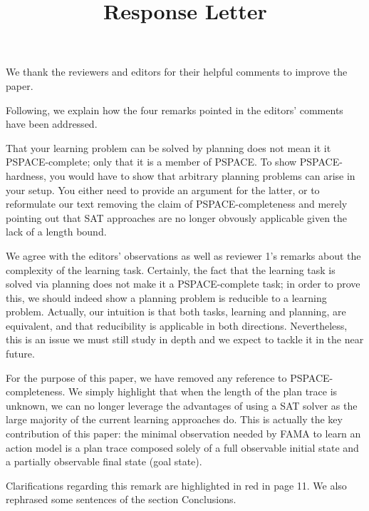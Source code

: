 \documentclass{article}
\title{\textbf{Response Letter}}
\newcommand{\FAMA}{{\small {\sffamily FAMA}}\xspace}
\begin{document}
\maketitle

We thank the reviewers and editors for their helpful comments to improve the paper.

\vspace{0.3cm}

Following, we explain how the four remarks pointed in the editors' comments have been addressed.


\vspace{0.1cm}

\begin{mdframed}[hidealllines=true,backgroundcolor=gray!20]
That your learning problem can be solved by planning does not mean it it PSPACE-complete; only that it is a member of PSPACE. To show PSPACE-hardness, you would have to show that arbitrary planning problems can arise in your setup. You either need to provide an argument for the latter, or to reformulate our text removing the claim of PSPACE-completeness and merely pointing out that SAT approaches are no longer obvously applicable given the lack of a length bound.
\end{mdframed}


We agree with the editors' observations as well as reviewer 1's remarks about the complexity of the learning task. Certainly, the fact that the learning task is solved via planning does not make it a PSPACE-complete task; in order to prove this, we should indeed show a planning problem is reducible to a learning problem. Actually, our intuition is that both tasks, learning and planning, are equivalent, and that reducibility is applicable in both directions. Nevertheless, this is an issue we must still study in depth and we expect to tackle it in the near future.

For the purpose of this paper, we have removed any reference to PSPACE-completeness. We simply highlight that when the length of the plan trace is unknown, we can no longer leverage the advantages of using a SAT solver as the large majority of the current learning approaches do. This is actually the key contribution of this paper: the minimal observation needed by \FAMA to learn an action model is a plan trace composed solely of a full observable initial state and a partially observable final state (goal state).

Clarifications regarding this remark are highlighted in red in page 11. We also rephrased some sentences of the section Conclusions.
\end{document}
